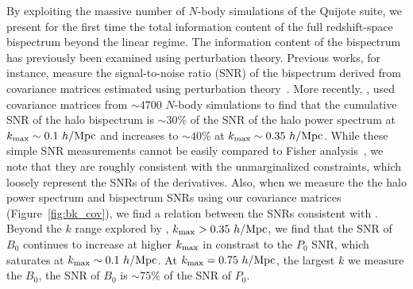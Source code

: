 
By exploiting the massive number of $N$-body simulations of the Quijote 
suite, we present for the first time the total information content of the 
full redshift-space bispectrum beyond the linear regime. The information content 
of the bispectrum has previously been examined using perturbation 
theory. Previous works, for instance, measure the signal-to-noise ratio (SNR) 
of the bispectrum derived from covariance matrices estimated using perturbation 
theory~\citep{sefusatti2005, sefusatti2006, chan2017}. More recently, \cite{chan2017},
used covariance matrices from %
$\sim 4700$ $N$-body simulations to find that the cumulative SNR of the halo bispectrum is 
$\sim 30\%$ of the SNR of the halo power spectrum at $k_{\rm max} \sim 0.1~h/{\rm Mpc}$ 
and increases to $\sim 40\%$ at $k_{\rm max}\sim 0.35~h/{\rm Mpc}$. While these simple 
SNR measurements cannot be easily compared to Fisher analysis~\citep{repp2015, blot2016}, 
we note that they are roughly consistent with the unmarginalized constraints, 
which loosely represent the SNRs of the derivatives. 
Also, when we measure the the halo power spectrum and bispectrum SNRs using our 
covariance matrices (Figure~\ref{fig:bk_cov}), we find a relation between the 
SNRs consistent with \cite{chan2017}. Beyond the $k$ range explored by \cite{chan2017},  
$k_{\rm max}>0.35~h/{\rm Mpc}$, we find that the SNR of $B_0$ continues to increase 
at higher $k_{\rm max}$ in constrast to the $P_0$ SNR, which saturates at 
$k_{\rm max}\sim 0.1~h/{\rm Mpc}$. At $k_{\rm max} = 0.75~h/{\rm Mpc}$, the largest $k$ we 
measure the $B_0$, the SNR of $B_0$ is $\sim75\%$ of the SNR of $P_0$.

